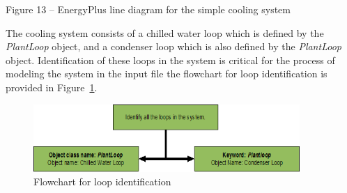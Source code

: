 Figure 13 -- EnergyPlus line diagram for the simple cooling system

The cooling system consists of a chilled water loop which is defined by the \emph{PlantLoop} object, and a condenser loop which is also defined by the \emph{PlantLoop} object. Identification of these loops in the system is critical for the process of modeling the system in the input file the flowchart for loop identification is provided in Figure~\ref{fig:flowchart-for-loop-identification}.

\begin{figure}[hbtp] %
\centering
\includegraphics[width=0.9\textwidth, height=0.9\textheight, keepaspectratio=true]{media/image014.png}
\caption{Flowchart for loop identification \protect \label{fig:flowchart-for-loop-identification}}
\end{figure}
